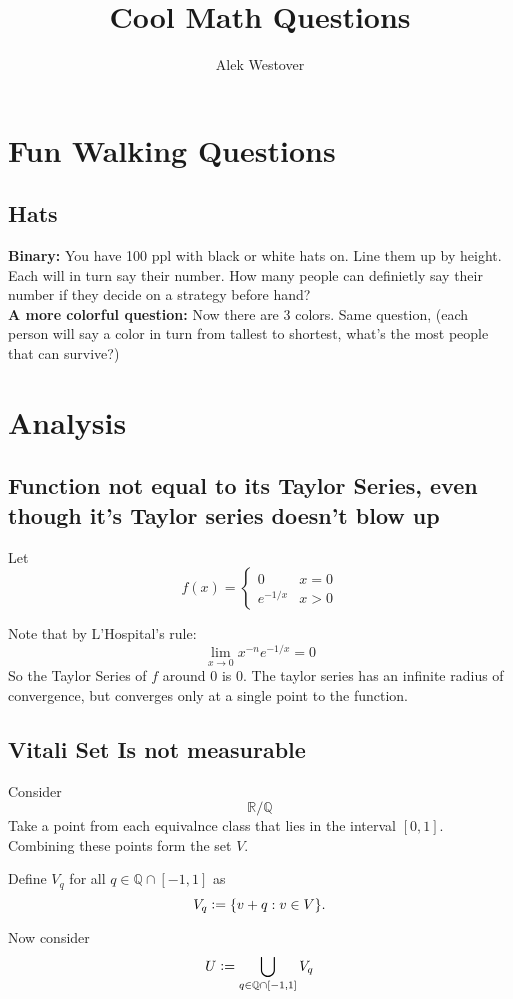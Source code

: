 \documentclass{article}[11pt]
\author{Alek Westover}
\title{Cool Math Questions}
\newcommand{\defeq}{\vcentcolon=}
\begin{document}
\maketitle
\tableofcontents

\section{Fun Walking Questions}
\subsection{Hats}

\textbf{Binary:}
You have 100 ppl with black or white hats on. Line them up by height. Each will
in turn say their number. How many people can definietly say their number if
they decide on a strategy before hand?\\
\textbf{A more colorful question:}
Now there are 3 colors. Same question, (each person will say a color in turn from tallest to shortest, what's the most people that can survive?)


\section{Analysis}
\subsection{Function not equal to its Taylor Series, even though it's Taylor series doesn't blow up}
Let $$f(x) = \begin{cases}
	0 & x=0 \\
	e^{-1/x} & x>0
\end{cases}$$

Note that by L'Hospital's rule: $$\lim_{x\to 0} x^{-n} e^{-1/x} = 0$$
So the Taylor Series of $f$ around $0$ is $0$.
The taylor series has an infinite radius of convergence, but converges only at a single point to the function.

\subsection{Vitali Set Is not measurable}
Consider
$$\mathbb{R} / \mathbb{Q}$$
Take a point from each equivalnce class that lies in the interval $[0,1]$.
Combining these points form the set $V$.

Define $V_q$ for all $q\in \mathbb{Q} \cap [-1,1]$ as 
$$V_q \defeq \{v+q : v \in V\}.$$

Now consider $$U \defeq \bigcup_{q \in \mathbb{Q}\cap [-1,1]} V_q$$
\end{document}

